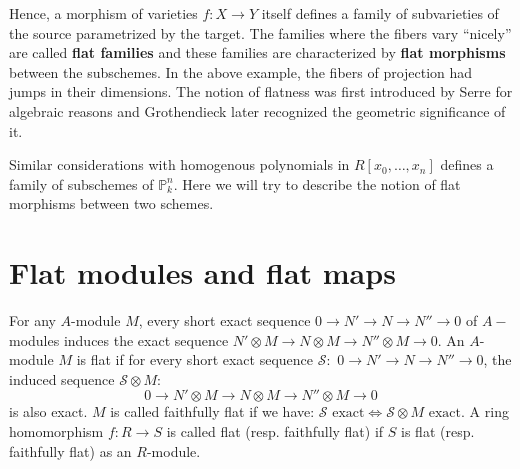 \documentclass[12pt]{article}
\theoremstyle{mytheoremstyle}
\newcommand{\bP}{\mathbb{P}}
\begin{document}
\vspace*{5mm}

\hspace*{8mm}Hence, a morphism of varieties $f:X\to Y$ itself defines a family of subvarieties
of the source parametrized by the target. The families where the
fibers vary ``nicely'' are called \textbf{flat families} and these
families are characterized by \textbf{flat morphisms} between
the subschemes. In the above example, the fibers of projection had
jumps in their dimensions.
The notion of flatness was first introduced by
Serre for algebraic reasons and Grothendieck later recognized the
geometric significance of it.

\vspace*{2mm}
\hspace*{8mm}Similar considerations with homogenous polynomials
in $R[x_0,\ldots,x_n]$
defines a family of subschemes of $\bP^n_k$.
Here we will try to describe the notion of flat morphisms
between two schemes.

\section{Flat modules and flat maps}

\hspace*{8mm}For any $A$-module $M$, every short exact sequence
$0\longrightarrow N'\longrightarrow N\longrightarrow N''
\longrightarrow 0$ of $A-$ modules induces the exact sequence
$ N'\otimes M\longrightarrow N\otimes M
\longrightarrow N''\otimes M\longrightarrow 0$.
An $A$-module $M$ is flat if for every short exact sequence
$\mathcal{S}:$
$0\longrightarrow N'\longrightarrow N\longrightarrow N''
\longrightarrow 0$, the induced sequence $\mathcal{S}\otimes M:$ 
$$0\longrightarrow N'\otimes M\longrightarrow N\otimes M
\longrightarrow N''\otimes M\longrightarrow 0$$
is also exact. $M$ is called faithfully flat if we have:
$\mathcal{S}\text{ exact}\iff \mathcal{S}\otimes M \text{ exact}.$
A ring homomorphism $f:R \to S$ is called flat (resp. faithfully flat)
if $S$ is flat (resp. faithfully flat) as
an $R$-module.
\end{document}
